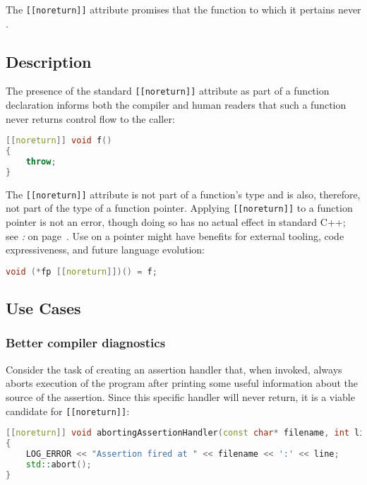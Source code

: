 


The \texttt{[[noreturn]]} attribute promises that the function to which
it pertains never .

\subsection[Description]{Description}\label{description}

The presence of the standard \texttt{[[noreturn]]} attribute as part of
a function declaration informs both the compiler and human readers that
such a function never returns control flow to the caller:

\begin{lstlisting}[language=C++]
[[noreturn]] void f()
{
    throw;
}
\end{lstlisting}
    
\noindent The \texttt{[[noreturn]]} attribute is not part of a function's type
and is also, therefore, not part of the type of a function pointer. Applying \texttt{[[noreturn]]} to a function
pointer is not an error, though doing so has no actual effect in standard C++; see
{\it{}: } on page~\pageref{misuse-of-[[noreturn]]-on-function-pointers}. Use on a pointer might have
benefits for external tooling, code expressiveness, and future language
evolution:

\begin{lstlisting}[language=C++]
void (*fp [[noreturn]])() = f;
\end{lstlisting}
    

\subsection[Use Cases]{Use Cases}\label{use-cases}

\subsubsection[Better compiler diagnostics]{Better compiler diagnostics}\label{better-compiler-diagnostics}

Consider the task of creating an assertion handler that, when invoked,
always aborts execution of the program after printing some useful
information about the source of the assertion. Since this specific
handler will never return, it is a viable candidate for
\texttt{[[noreturn]]}:

\begin{lstlisting}[language=C++]
[[noreturn]] void abortingAssertionHandler(const char* filename, int line)
{
    LOG_ERROR << "Assertion fired at " << filename << ':' << line;
    std::abort();
}
\end{lstlisting}
    

